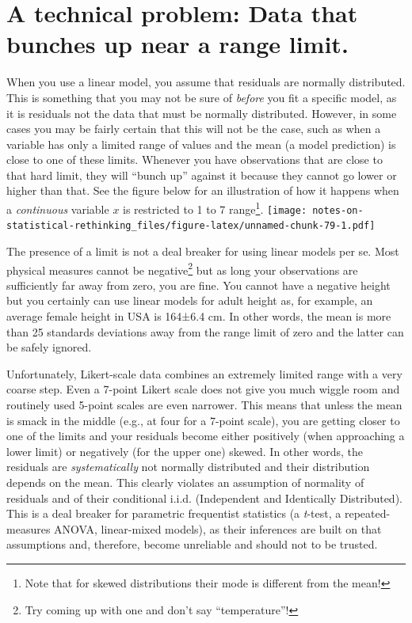 \documentclass[
]{book}
\begin{document}
\hypertarget{a-technical-problem-data-that-bunches-up-near-a-range-limit.}{%
\section{A technical problem: Data that bunches up near a range limit.}\label{a-technical-problem-data-that-bunches-up-near-a-range-limit.}}

When you use a linear model, you assume that residuals are normally distributed. This is something that you may not be sure of \emph{before} you fit a specific model, as it is residuals not the data that must be normally distributed. However, in some cases you may be fairly certain that this will not be the case, such as when a variable has only a limited range of values and the mean (a model prediction) is close to one of these limits. Whenever you have observations that are close to that hard limit, they will ``bunch up'' against it because they cannot go lower or higher than that. See the figure below for an illustration of how it happens when a \emph{continuous} variable \(x\) is restricted to 1 to 7 range\footnote{Note that for skewed distributions their mode is different from the mean!}.
\texttt{[image: notes-on-statistical-rethinking\_files/figure-latex/unnamed-chunk-79-1.pdf]}

The presence of a limit is not a deal breaker for using linear models per se. Most physical measures cannot be negative\footnote{Try coming up with one and don't say ``temperature''!} but as long your observations are sufficiently far away from zero, you are fine. You cannot have a negative height but you certainly can use linear models for adult height as, for example, an average female height in USA is 164±6.4 cm. In other words, the mean is more than 25 standards deviations away from the range limit of zero and the latter can be safely ignored.

Unfortunately, Likert-scale data combines an extremely limited range with a very coarse step. Even a 7-point Likert scale does not give you much wiggle room and routinely used 5-point scales are even narrower. This means that unless the mean is smack in the middle (e.g., at four for a 7-point scale), you are getting closer to one of the limits and your residuals become either positively (when approaching a lower limit) or negatively (for the upper one) skewed. In other words, the residuals are \emph{systematically} not normally distributed and their distribution depends on the mean. This clearly violates an assumption of normality of residuals and of their conditional i.i.d. (Independent and Identically Distributed). This is a deal breaker for parametric frequentist statistics (a \emph{t}-test, a repeated-measures ANOVA, linear-mixed models), as their inferences are built on that assumptions and, therefore, become unreliable and should not to be trusted.
\end{document}
